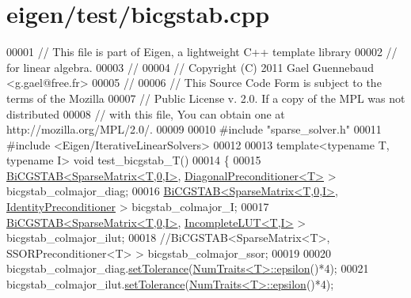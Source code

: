 \hypertarget{eigen_2test_2bicgstab_8cpp_source}{}\section{eigen/test/bicgstab.cpp}
\label{eigen_2test_2bicgstab_8cpp_source}

\begin{DoxyCode}
00001 \textcolor{comment}{// This file is part of Eigen, a lightweight C++ template library}
00002 \textcolor{comment}{// for linear algebra.}
00003 \textcolor{comment}{//}
00004 \textcolor{comment}{// Copyright (C) 2011 Gael Guennebaud <g.gael@free.fr>}
00005 \textcolor{comment}{//}
00006 \textcolor{comment}{// This Source Code Form is subject to the terms of the Mozilla}
00007 \textcolor{comment}{// Public License v. 2.0. If a copy of the MPL was not distributed}
00008 \textcolor{comment}{// with this file, You can obtain one at http://mozilla.org/MPL/2.0/.}
00009 
00010 \textcolor{preprocessor}{#include "sparse\_solver.h"}
00011 \textcolor{preprocessor}{#include <Eigen/IterativeLinearSolvers>}
00012 
00013 \textcolor{keyword}{template}<\textcolor{keyword}{typename} T, \textcolor{keyword}{typename} I> \textcolor{keywordtype}{void} test\_bicgstab\_T()
00014 \{
00015   \hyperlink{group___iterative_linear_solvers___module_class_eigen_1_1_bi_c_g_s_t_a_b}{BiCGSTAB<SparseMatrix<T,0,I>}, 
      \hyperlink{group___iterative_linear_solvers___module_class_eigen_1_1_diagonal_preconditioner}{DiagonalPreconditioner<T>} >     bicgstab\_colmajor\_diag;
00016   \hyperlink{group___iterative_linear_solvers___module_class_eigen_1_1_bi_c_g_s_t_a_b}{BiCGSTAB<SparseMatrix<T,0,I>}, 
      \hyperlink{group___iterative_linear_solvers___module_class_eigen_1_1_identity_preconditioner}{IdentityPreconditioner}    >     bicgstab\_colmajor\_I;
00017   \hyperlink{group___iterative_linear_solvers___module_class_eigen_1_1_bi_c_g_s_t_a_b}{BiCGSTAB<SparseMatrix<T,0,I>}, \hyperlink{group___iterative_linear_solvers___module_class_eigen_1_1_incomplete_l_u_t}{IncompleteLUT<T,I>} >         
           bicgstab\_colmajor\_ilut;
00018   \textcolor{comment}{//BiCGSTAB<SparseMatrix<T>, SSORPreconditioner<T> >     bicgstab\_colmajor\_ssor;}
00019 
00020   bicgstab\_colmajor\_diag.\hyperlink{group___iterative_linear_solvers___module_ac160a444af8998f93da9aa30e858470d}{setTolerance}(\hyperlink{group___core___module_struct_eigen_1_1_num_traits}{NumTraits<T>::epsilon}()*4);
00021   bicgstab\_colmajor\_ilut.\hyperlink{group___iterative_linear_solvers___module_ac160a444af8998f93da9aa30e858470d}{setTolerance}(\hyperlink{group___core___module_struct_eigen_1_1_num_traits}{NumTraits<T>::epsilon}()*4);

\end{DoxyCode}
